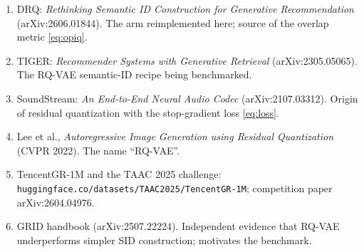 \documentclass[11pt]{article}
\begin{document}
\begin{enumerate}[nosep,leftmargin=*]
  \item DRQ: \emph{Rethinking Semantic ID Construction for Generative
        Recommendation} (arXiv:2606.01844). The arm reimplemented here; source
        of the overlap metric \eqref{eq:opiq}.
  \item TIGER: \emph{Recommender Systems with Generative Retrieval}
        (arXiv:2305.05065). The RQ-VAE semantic-ID recipe being benchmarked.
  \item SoundStream: \emph{An End-to-End Neural Audio Codec}
        (arXiv:2107.03312). Origin of residual quantization with the
        stop-gradient loss \eqref{eq:loss}.
  \item Lee et al., \emph{Autoregressive Image Generation using Residual
        Quantization} (CVPR 2022). The name ``RQ-VAE''.
  \item TencentGR-1M and the TAAC 2025 challenge:
        \texttt{huggingface.co/datasets/TAAC2025/TencentGR-1M}; competition
        paper arXiv:2604.04976.
  \item GRID handbook (arXiv:2507.22224). Independent evidence that RQ-VAE
        underperforms simpler SID construction; motivates the benchmark.
\end{enumerate}
\end{document}
